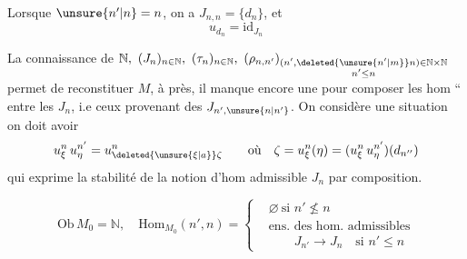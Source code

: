 Lorsque \(\unsure{n'|n}=n\), on a \(J_{n,n}=\{d_n\}\), et
\[
 u_{d_n}=\mathrm{id}_{J_n}
\]

La connaissance de \(\mathbb N,\ (J_n)_{n\in\mathbb N},\ (\tau_n)_{n\in\mathbb N},\
(\rho_{n,n'})_{\substack{(n',\deleted{\unsure{n'|m}}n)\in\mathbb N\times\mathbb N\\ n'\leq n}}\) permet de reconstituer   \(M\), à   près, il manque encore une   pour composer les hom `` entre les \(J_n\), i.e ceux provenant des \(J_{n',\unsure{n|n'}}\).  On considère une situation
on doit avoir
\[
 u_\xi^n\,u_\eta^{n'}=u_{\deleted{\unsure{\xi|a}}\zeta}^{n}
 \qquad\text{où}\quad \zeta=u_\xi^n(\eta)=
 (u_\xi^n\,u_\eta^{n'})(d_{n''})
\]
qui exprime la  stabilité de la notion d'hom admissible  \(J_n\) par composition.

 
\[
 \mathrm{Ob}\,M_0=\mathbb N,\quad \mathrm{Hom}_{M_0}(n',n)=
 \left\{\begin{aligned}
 &\varnothing\ \text{si }n'\nleq n\\
 &\text{ens. des hom. admissibles}\\
 &\qquad J_{n'}\to J_n\quad\text{si }n'\leq n
 \end{aligned}\right.
\]
